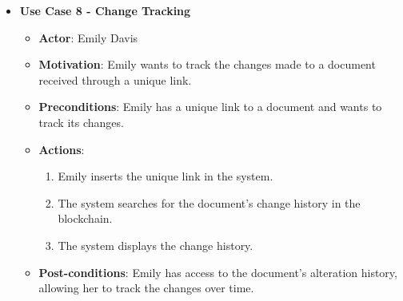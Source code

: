 \documentclass[a4paper,11pt]{article}
\begin{document}
\begin{itemize}
            \item \textbf{Use Case 8 - Change Tracking}
            \begin{itemize}
                \item \textbf{Actor}: Emily Davis
                \item \textbf{Motivation}: Emily wants to track the changes made to a document received through a unique link.
                \item \textbf{Preconditions}: Emily has a unique link to a document and wants to track its changes.
                \item \textbf{Actions}:
                \begin{enumerate}
                    \item Emily inserts the unique link in the system.
                    \item The system searches for the document’s change history in the blockchain.
                    \item The system displays the change history.
                \end{enumerate}
                \item \textbf{Post-conditions}: Emily has access to the document’s alteration history, allowing her to track the changes over time.
            \end{itemize}
        \end{itemize}
    
    
\end{document}
